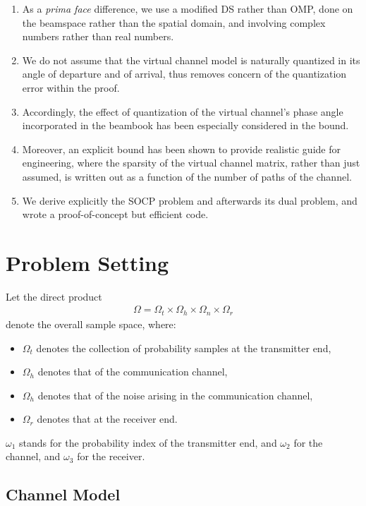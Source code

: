 \documentclass[12pt]{article}
\begin{document}
\begin{enumerate}
\item As a \textit{prima face} difference, we use a modified DS rather than OMP, done on the beamspace rather than the spatial domain, and involving complex numbers rather than real numbers.
\item We do not assume that the virtual channel model is naturally quantized in its angle of departure and of arrival, thus removes concern of the quantization error within the proof.
\item Accordingly, the effect of quantization of the virtual channel's phase angle incorporated in the beambook has been especially considered in the bound.
\item Moreover, an explicit bound has been shown to provide realistic guide for engineering, where the sparsity of the virtual channel matrix, rather than just assumed, is written out as a function of the number of paths of the channel.
\item We derive explicitly the SOCP problem and afterwards its dual problem, and wrote a proof-of-concept but efficient code.
\end{enumerate}

\section{Problem Setting}

Let the direct product
%
\begin{gather}
\Omega
=\Omega_t \times \Omega_h \times \Omega_n \times \Omega_r
\end{gather}
%
denote the overall sample space, where:
%
\begin{itemize}
\item \(\Omega_t\) denotes the collection of probability samples at the transmitter end,
\item \(\Omega_h\) denotes that of the communication channel,
\item \(\Omega_h\) denotes that of the noise arising in the communication channel,
\item \(\Omega_r\) denotes that at the receiver end.
\end{itemize}
%
\(\omega_1\) stands for the probability index of the transmitter end, and \(\omega_2\) for the channel, and \(\omega_3\) for the receiver.



\subsection{Channel Model}
\end{document}
